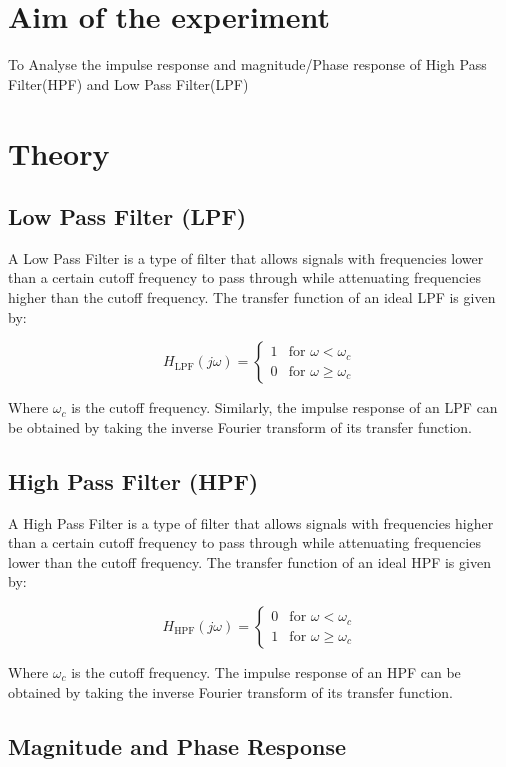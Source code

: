 \documentclass[journal,12pt,onecolumn]{IEEEtran}
\theoremstyle{remark}
\begin{document}
\section{Aim of the experiment}
To Analyse the impulse response and magnitude/Phase response of High Pass Filter(HPF) and Low Pass Filter(LPF)
\section{Theory}
\subsection{Low Pass Filter (LPF)}

A Low Pass Filter is a type of filter that allows signals with frequencies lower than a certain cutoff frequency to pass through while attenuating frequencies higher than the cutoff frequency. The transfer function of an ideal LPF is given by:

\[
H_{\text{LPF}}(j\omega) = \begin{cases}
1 & \text{for } \omega < \omega_c \\
0 & \text{for } \omega \geq \omega_c
\end{cases}
\]

Where $\omega_c$ is the cutoff frequency. Similarly, the impulse response of an LPF can be obtained by taking the inverse Fourier transform of its transfer function.


\subsection{High Pass Filter (HPF)}

A High Pass Filter is a type of filter that allows signals with frequencies higher than a certain cutoff frequency to pass through while attenuating frequencies lower than the cutoff frequency. The transfer function of an ideal HPF is given by:

\[
H_{\text{HPF}}(j\omega) = \begin{cases}
0 & \text{for } \omega < \omega_c \\
1 & \text{for } \omega \geq \omega_c
\end{cases}
\]

Where $\omega_c$ is the cutoff frequency. The impulse response of an HPF can be obtained by taking the inverse Fourier transform of its transfer function.


\subsection{Magnitude and Phase Response}
\end{document}
